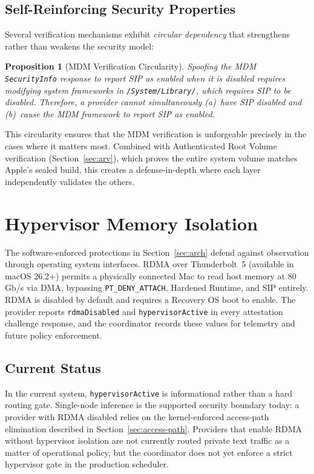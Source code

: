 \documentclass[10pt,twocolumn,letterpaper]{article}
\newtheorem{proposition}{Proposition}
\begin{document}
\subsection{Self-Reinforcing Security Properties}

Several verification mechanisms exhibit \emph{circular dependency} that strengthens rather than weakens the security model:

\begin{proposition}[MDM Verification Circularity]
\label{prop:mdm-circular}
Spoofing the MDM \texttt{SecurityInfo} response to report SIP as enabled when it is disabled requires modifying system frameworks in \texttt{/System/Library/}, which requires SIP to be disabled. Therefore, a provider cannot simultaneously (a)~have SIP disabled and (b)~cause the MDM framework to report SIP as enabled.
\end{proposition}

This circularity ensures that the MDM verification is unforgeable precisely in the cases where it matters most. Combined with Authenticated Root Volume verification (Section~\ref{sec:arv}), which proves the entire system volume matches Apple's sealed build, this creates a defense-in-depth where each layer independently validates the others.

\section{Hypervisor Memory Isolation}
\label{sec:hypervisor}

The software-enforced protections in Section~\ref{sec:arch} defend against observation through operating system interfaces. RDMA over Thunderbolt~5 (available in macOS 26.2+) permits a physically connected Mac to read host memory at 80\,Gb/s via DMA, bypassing \texttt{PT\_DENY\_ATTACH}, Hardened Runtime, and SIP entirely. RDMA is disabled by default and requires a Recovery OS boot to enable. The provider reports \texttt{rdmaDisabled} and \texttt{hypervisorActive} in every attestation challenge response, and the coordinator records these values for telemetry and future policy enforcement.

\subsection{Current Status}

In the current system, \texttt{hypervisorActive} is informational rather than a hard routing gate. Single-node inference is the supported security boundary today: a provider with RDMA disabled relies on the kernel-enforced access-path elimination described in Section~\ref{sec:access-path}. Providers that enable RDMA without hypervisor isolation are not currently routed private text traffic as a matter of operational policy, but the coordinator does not yet enforce a strict hypervisor gate in the production scheduler.
\end{document}
